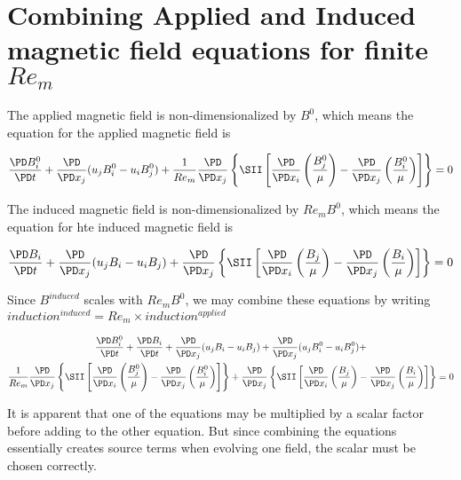 \documentclass[11pt]{article}
\begin{document}
\section{Combining Applied and Induced magnetic field equations for finite \texorpdfstring{$Re_m$}{LG}}

The applied magnetic field is non-dimensionalized by $B^0$, which means the equation for the applied magnetic field is

\begin{equation}
	\frac{\PD B_i^0}{\PD t}
	+ \frac{\PD}{\PD x_j} (u_j B_i^0 - u_i B_j^0)
	+ \frac{1}{Re_m}
	\frac{\PD}{\PD x_j}
	\left\{ \SII
	\left[
	\frac{\PD}{\PD x_i}
	\left( \frac{B_j^0}{\mu} \right) -
	\frac{\PD}{\PD x_j}
	\left( \frac{B_i^0}{\mu} \right)
	\right]
	\right\} = 0
\end{equation}

The induced magnetic field is non-dimensionalized by $Re_m B^0$, which means the equation for hte induced magnetic field is


\begin{equation}
	\frac{\PD B_i}{\PD t}
	+ \frac{\PD}{\PD x_j} (u_j B_i - u_i B_j)
	+
	\frac{\PD}{\PD x_j}
	\left\{ \SII
	\left[
	\frac{\PD}{\PD x_i}
	\left( \frac{B_j}{\mu} \right) -
	\frac{\PD}{\PD x_j}
	\left( \frac{B_i}{\mu} \right)
	\right]
	\right\} = 0
\end{equation}

Since $B^{induced}$ scales with $Re_m B^0$, we may combine these equations by writing $induction^{induced}=Re_m \times induction^{applied}$

\begin{multline}
	\frac{\PD B_i^0}{\PD t} +
	\frac{\PD B_i}{\PD t}
	+ \frac{\PD}{\PD x_j} (u_j B_i - u_i B_j)
	+ \frac{\PD}{\PD x_j} (u_j B_i^0 - u_i B_j^0)
	+ \\
	\frac{1}{Re_m}
	\frac{\PD}{\PD x_j}
	\left\{ \SII
	\left[
	\frac{\PD}{\PD x_i}
	\left( \frac{B_j^0}{\mu} \right) -
	\frac{\PD}{\PD x_j}
	\left( \frac{B_i^0}{\mu} \right)
	\right]
	\right\}
	+
	\frac{\PD}{\PD x_j}
	\left\{ \SII
	\left[
	\frac{\PD}{\PD x_i}
	\left( \frac{B_j}{\mu} \right) -
	\frac{\PD}{\PD x_j}
	\left( \frac{B_i}{\mu} \right)
	\right]
	\right\}
	= 0
\end{multline}

It is apparent that one of the equations may be multiplied by a scalar factor before adding to the other equation. But since combining the equations essentially creates source terms when evolving one field, the scalar must be chosen correctly.
\end{document}
